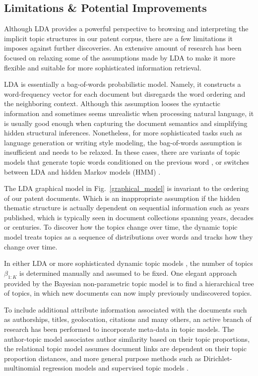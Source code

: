 \documentclass[conference]{IEEEtran}
\begin{document}
\subsection{Limitations \& Potential Improvements}
Although LDA provides a powerful perspective to browsing and interpreting the implicit topic structures in our patent corpus, there are a few limitations it imposes against further discoveries. An extensive amount of research has been focused on relaxing some of the assumptions made by LDA to make it more flexible and suitable for more sophisticated information retrieval. 

LDA is essentially a bag-of-words probabilistic model. Namely, it constructs a word-frequency vector for each document but disregards the word ordering and the neighboring context. Although this assumption looses the syntactic information and sometimes seems unrealistic when processing natural language, it is usually good enough when capturing the document semantics and simplifying hidden structural inferences. Nonetheless, for more sophisticated tasks such as language generation or writing style modeling, the bag-of-words assumption is insufficient and needs to be relaxed. In these cases, there are variants of topic models that generate topic words conditioned on the previous word \cite{wallach2006}, or switches between LDA and hidden Markov models (HMM) \cite{griffiths2005}.

The LDA graphical model in Fig.~\ref{graphical_model} is invariant to the ordering of our patent documents. Which is an inappropriate assumption if the hidden thematic structure is actually dependent on sequential information such as years published, which is typically seen in document collections spanning years, decades or centuries. To discover how the topics change over time, the dynamic topic model \cite{blei2006} treats topics as a sequence of distributions over words and tracks how they change over time.

In either LDA or more sophisticated dynamic topic models \cite{blei2006}, the number of topics $\beta_{1:K}$ is determined manually and assumed to be fixed. One elegant approach provided by the Bayesian non-parametric topic model \cite{teh2006} is to find a hierarchical tree of topics, in which new documents can now imply previously undiscovered topics.

To include additional attribute information associated with the documents such as authorships, titles, geolocation, citations and many others, an active branch of research has been performed to incorporate meta-data in topic models. The author-topic model \cite{rosen-zvi2004} associates author similarity based on their topic proportions, the relational topic model \cite{blei2010} assumes document links are dependent on their topic proportion distances, and more general purpose methods such as Dirichlet-multinomial regression models \cite{mimno2008} and supervised topic models \cite{blei2007}.
\end{document}

